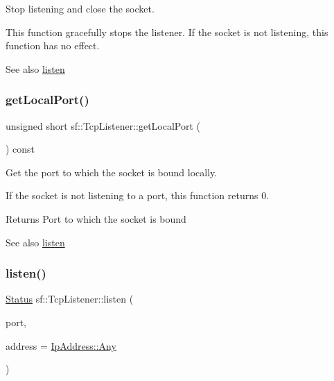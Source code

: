 Stop listening and close the socket. 

This function gracefully stops the listener. If the socket is not listening, this function has no effect.

\begin{DoxySeeAlso}{See also}
\hyperlink{classsf_1_1_tcp_listener_a9504758ea3570e62cb20b209c11776a1}{listen} 
\end{DoxySeeAlso}
\mbox{\label{classsf_1_1_tcp_listener_a784b9a9c59d4cdbae1795e90b8015780}} 
\subsubsection{\texorpdfstring{get\+Local\+Port()}{getLocalPort()}}
{\footnotesize\ttfamily unsigned short sf\+::\+Tcp\+Listener\+::get\+Local\+Port (\begin{DoxyParamCaption}{ }\end{DoxyParamCaption}) const}



Get the port to which the socket is bound locally. 

If the socket is not listening to a port, this function returns 0.

\begin{DoxyReturn}{Returns}
Port to which the socket is bound
\end{DoxyReturn}
\begin{DoxySeeAlso}{See also}
\hyperlink{classsf_1_1_tcp_listener_a9504758ea3570e62cb20b209c11776a1}{listen} 
\end{DoxySeeAlso}
\mbox{\label{classsf_1_1_tcp_listener_a9504758ea3570e62cb20b209c11776a1}} 
\subsubsection{\texorpdfstring{listen()}{listen()}}
{\footnotesize\ttfamily \hyperlink{classsf_1_1_socket_a51bf0fd51057b98a10fbb866246176dc}{Status} sf\+::\+Tcp\+Listener\+::listen (\begin{DoxyParamCaption}\item[{unsigned short}]{port,  }\item[{const \hyperlink{classsf_1_1_ip_address}{Ip\+Address} \&}]{address = {\ttfamily \hyperlink{classsf_1_1_ip_address_a3dbc10b0dc6804cc69e29342f7406907}{Ip\+Address\+::\+Any}} }\end{DoxyParamCaption})}



